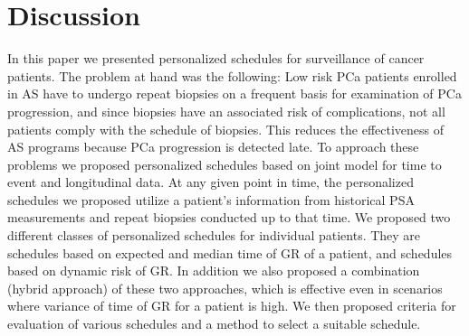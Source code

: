 
\section{Discussion}
\label{sec: discussion}
In this paper we presented personalized schedules for surveillance of cancer patients. The problem at hand was the following: Low risk PCa patients enrolled in AS have to undergo repeat biopsies on a frequent basis for examination of PCa progression, and since biopsies have an associated risk of complications, not all patients comply with the schedule of biopsies. This reduces the effectiveness of AS programs because PCa progression is detected late. To approach these problems we proposed personalized schedules based on joint model for time to event and longitudinal data. At any given point in time, the personalized schedules we proposed utilize a patient's information from historical PSA measurements and repeat biopsies conducted up to that time. We proposed two different classes of personalized schedules for individual patients. They are schedules based on expected and median time of GR of a patient, and schedules based on dynamic risk of GR. In addition we also proposed a combination (hybrid approach) of these two approaches, which is effective even in scenarios where variance of time of GR for a patient is high. We then proposed criteria for evaluation of various schedules and a method to select a suitable schedule.

